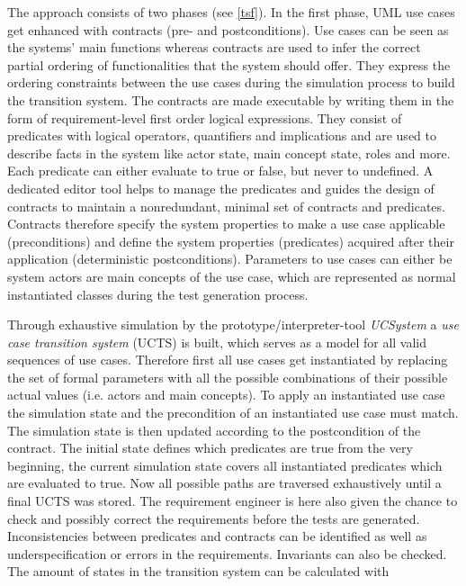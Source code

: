The approach consists of two phases (see \autoref{tsf}). In the first phase, UML use cases get enhanced with contracts (pre- and postconditions). Use cases can be seen as the systems' main functions whereas contracts are used to infer the correct partial ordering of functionalities that the system should offer. They express the ordering constraints between the use cases during the simulation process to build the transition system. The contracts are made executable by writing them in the form of requirement-level first order logical expressions. They consist of predicates with logical operators, quantifiers and implications and are used to describe facts in the system like actor state, main concept state, roles and more. Each predicate can either evaluate to true or false, but never to undefined. A dedicated editor tool helps to manage the predicates and guides the design of contracts to maintain a nonredundant, minimal set of contracts and predicates. Contracts therefore specify the system properties to make a use case applicable (preconditions) and define the system properties (predicates) acquired after their application (deterministic postconditions). Parameters to use cases can either be system actors are main concepts of the use case, which are represented as normal instantiated classes during the test generation process. 

Through exhaustive simulation by the prototype/interpreter-tool \textit{UCSystem} a \textit{use case transition system} (UCTS) is built, which serves as a model for all valid sequences of use cases. Therefore first all use cases get instantiated by replacing the set of formal parameters with all the possible combinations of their possible actual values (i.e. actors and main concepts). To apply an instantiated use case the simulation state and the precondition of an instantiated use case must match. The simulation state is then updated according to the postcondition of the contract. The initial state defines which predicates are true from the very beginning, the current simulation state covers all instantiated predicates which are evaluated to true. Now all possible paths are traversed exhaustively until a final UCTS was stored. The requirement engineer is here also given the chance to check and possibly correct the requirements before the tests are generated. Inconsistencies between predicates and contracts can be identified as well as underspecification or errors in the requirements. Invariants can also be checked. The amount of states in the transition system can be calculated with

